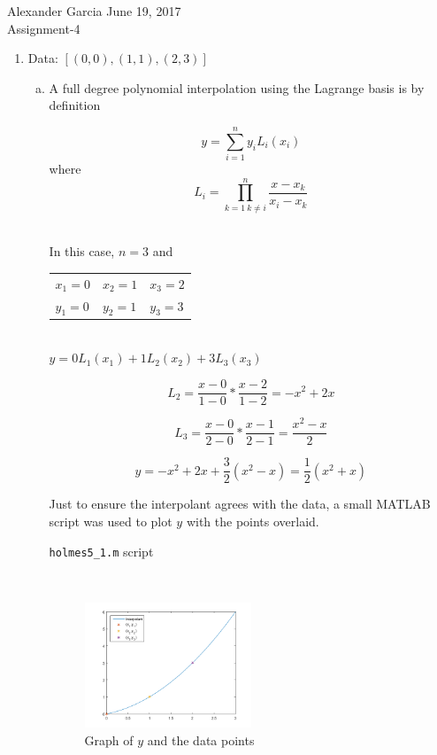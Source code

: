 \documentclass[11pt]{article}
\begin{document}
\lstset{stringstyle=\ttfamily,
	showstringspaces=false,
	basicstyle=\small}

\begin{center} Alexander Garcia \hfill June 19, 2017 \\ Assignment-4 \end{center}

\medskip

\begin{enumerate}

	\item Data: $[(0,0),(1,1),(2,3)]$

		\begin{enumerate}[(a)]

			\item A full degree polynomial interpolation using the Lagrange basis is by definition

			\[
				y = \sum_{i = 1}^{n} y_i L_i(x_i)
			\]
			where
			\[
				L_i = \prod_{k = 1\ k \neq i}^{n} \frac{x-x_k}{x_i-x_k}
			\] \

			In this case, $n=3$ and

			\begin{tabular}{lll}
				$x_1 = 0$ & $x_2 = 1$ & $x_3 = 2$ \\
				$y_1 = 0$ & $y_2 = 1$ & $y_3 = 3$ \\
			\end{tabular} \\

			$y = 0L_1(x_1) + 1L_2(x_2) + 3L_3(x_3)$

			\[
				L_2 = \frac{x-0}{1-0} * \frac{x-2}{1-2}
				= -x^2 + 2x
			\]

			\[
				L_3 = \frac{x-0}{2-0} * \frac{x-1}{2-1}
				= \frac{x^2-x}{2}
			\]

			\[
				y = -x^2 + 2x + \frac{3}{2}(x^2-x) = \frac{1}{2}(x^2 + x)
			\]

			Just to ensure the interpolant agrees with the data, a small MATLAB script was used to plot $y$ with the points
			overlaid.

			\begin{center}
				\texttt{holmes5\_1.m} script
			\end{center}
			 \

			\begin{figure}[H]
				\centering
				\includegraphics[width=0.5\textwidth]{holmes5_1.png}
				\caption{Graph of $y$ and the data points}
			\end{figure} \


\end{enumerate}
\end{enumerate}
\end{document}
